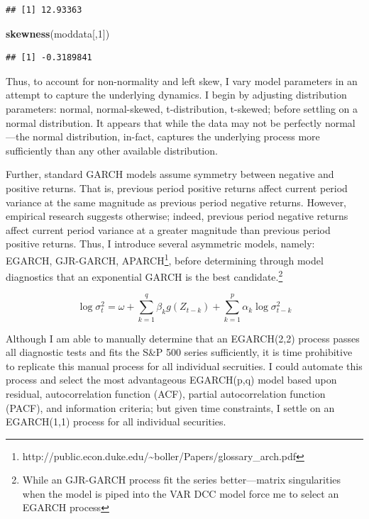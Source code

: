 \documentclass[]{elsarticle} %
\newenvironment{Shaded}{\begin{snugshade}}{\end{snugshade}}
\newcommand{\KeywordTok}[1]{\textcolor[rgb]{0.13,0.29,0.53}{\textbf{{#1}}}}
\newcommand{\DecValTok}[1]{\textcolor[rgb]{0.00,0.00,0.81}{{#1}}}
\newcommand{\NormalTok}[1]{{#1}}
\begin{document}
\begin{verbatim}
## [1] 12.93363
\end{verbatim}

\begin{Shaded}
\begin{Highlighting}[]
\KeywordTok{skewness}\NormalTok{(moddata[,}\DecValTok{1}\NormalTok{])}
\end{Highlighting}
\end{Shaded}

\begin{verbatim}
## [1] -0.3189841
\end{verbatim}

Thus, to account for non-normality and left skew, I vary model
parameters in an attempt to capture the underlying dynamics. I begin by
adjusting distribution parameters: normal, normal-skewed,
t-distribution, t-skewed; before settling on a normal distribution. It
appears that while the data may not be perfectly normal---the normal
distribution, in-fact, captures the underlying process more sufficiently
than any other available distribution.

Further, standard GARCH models assume symmetry between negative and
positive returns. That is, previous period positive returns affect
current period variance at the same magnitude as previous period
negative returns. However, empirical research suggests otherwise;
indeed, previous period negative returns affect current period variance
at a greater magnitude than previous period positive returns. Thus, I
introduce several asymmetric models, namely: EGARCH, GJR-GARCH,
APARCH\footnote{http://public.econ.duke.edu/\textasciitilde{}boller/Papers/glossary\_arch.pdf},
before determining through model diagnostics that an exponential GARCH
is the best candidate.\footnote{While an GJR-GARCH process fit the
  series better---matrix singularities when the model is piped into the
  VAR DCC model force me to select an EGARCH process}

\[\log\sigma_{t}^2=\omega+\sum_{k=1}^{q}\beta_{k}g(Z_{t-k})+\sum_{k=1}^{p}\alpha_{k}\log\sigma_{t-k}^{2}\]

Although I am able to manually determine that an EGARCH(2,2) process
passes all diagnostic tests and fits the S\&P 500 series sufficiently,
it is time prohibitive to replicate this manual process for all
individual secruities. I could automate this process and select the most
advantageous EGARCH(p,q) model based upon residual, autocorrelation
function (ACF), partial autocorrelation function (PACF), and information
criteria; but given time constraints, I settle on an EGARCH(1,1) process
for all individual securities.
\end{document}
